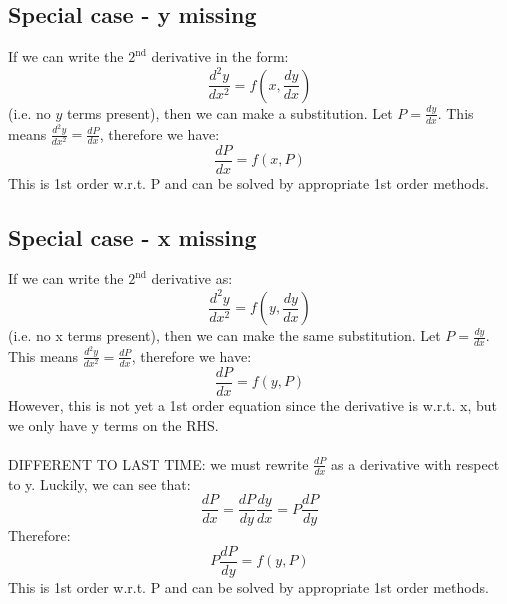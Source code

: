 \documentclass{scrartcl}
\begin{document}
\subsection{Special case - y missing}
If we can write the $ 2^{\textrm{nd}} $ derivative in the form:
\begin{equation}
\frac{d^{2}y}{dx^{2}} = f(x, \frac{dy}{dx})
\end{equation}
(i.e. no $ y $ terms present), then we can make a substitution. Let $ P = \frac{dy}{dx} $. This means $ \frac{d^{2}y}{dx^{2}} = \frac{dP}{dx} $, therefore we have:
\begin{equation}
\frac{dP}{dx} = f(x, P)
\end{equation}
This is 1st order w.r.t. P and can be solved by appropriate 1st order methods.

\subsection{Special case - x missing}
If we can write the $ 2^{\textrm{nd}} $ derivative as:
\begin{equation}
\frac{d^{2}y}{dx^{2}} = f(y, \frac{dy}{dx})
\end{equation}
(i.e. no x terms present), then we can make the same substitution. Let $ P = \frac{dy}{dx} $. This means $ \frac{d^{2}y}{dx^{2}} = \frac{dP}{dx} $, therefore we have:
\begin{equation}
\frac{dP}{dx} = f(y, P)
\end{equation}
However, this is not yet a 1st order equation since the derivative is w.r.t. x, but we only have y terms on the RHS.
\\\\
DIFFERENT TO LAST TIME: we must rewrite $ \frac{dP}{dx} $ as a derivative with respect to y. Luckily, we can see that:
\begin{equation}
\frac{dP}{dx} = \frac{dP}{dy}\frac{dy}{dx} = P\frac{dP}{dy}
\end{equation}
Therefore:
\begin{equation}
P\frac{dP}{dy} = f(y, P)
\end{equation}
This is 1st order w.r.t. P and can be solved by appropriate 1st order methods.
\end{document}
